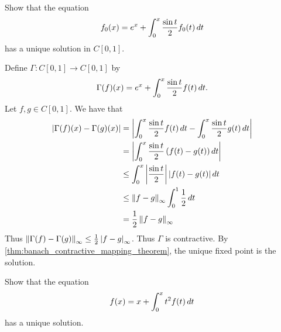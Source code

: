 \documentclass[notoc,notitlepage]{tufte-book}
\newcommand{\norm}[1]{\left\| #1 \right\|}
\begin{document}
\begin{eg}
  Show that the equation
  \begin{equation*}
    f_0(x) = e^{x} + \int_{0}^{x} \frac{\sin t}{2}f_0(t) \mathop{}\!d{t}
  \end{equation*}
  has a unique solution in $C[0, 1]$.
\end{eg}

\begin{solution}
  Define $\Gamma : C[0, 1] \to C[0, 1]$ by
  \begin{equation*}
    \Gamma(f)(x) = e^x + \int_{0}^{x} \frac{\sin t}{2} f(t) \mathop{}\!d{t}.
  \end{equation*}
  Let $f, g \in C[0, 1]$. We have that
  \begin{align*}
    \abs{ \Gamma(f)(x) - \Gamma(g)(x) }
      &= \abs{ \int_{0}^{x} \frac{\sin t}{2} f(t) \dif{t} - \int_{0}^{x} \frac{\sin t}{2} g(t) \dif{t} } \\
      &= \abs{ \int_{0}^{x} \frac{\sin t}{2} \left( f(t) - g(t) \right) \dif{t} } \\
      &\leq \int_{0}^{x} \abs{ \frac{\sin t}{2} } \abs{ f(t) - g(t) } \dif{t} \\
      &\leq \norm{ f - g }_\infty \int_{0}^{1}  \frac{1}{2} \dif{t} \\
      &= \frac{1}{2} \norm{ f - g }_\infty
  \end{align*}
  Thus $\norm{ \Gamma(f) - \Gamma(g) }_\infty \leq \frac{1}{2} \abs{ f - g }_\infty$. Thus $\Gamma$ is contractive. By \cref{thm:banach_contractive_mapping_theorem}, the unique fixed point is the solution.
\end{solution}

\begin{eg}
  Show that the equation
  \begin{equation}\label{eq:banach_contractive_map_eg2}
    f(x) = x + \int_{0}^{x} t^2 f(t) \mathop{}\!d{t}
  \end{equation}
  has a unique solution.
\end{eg}
\end{document}
